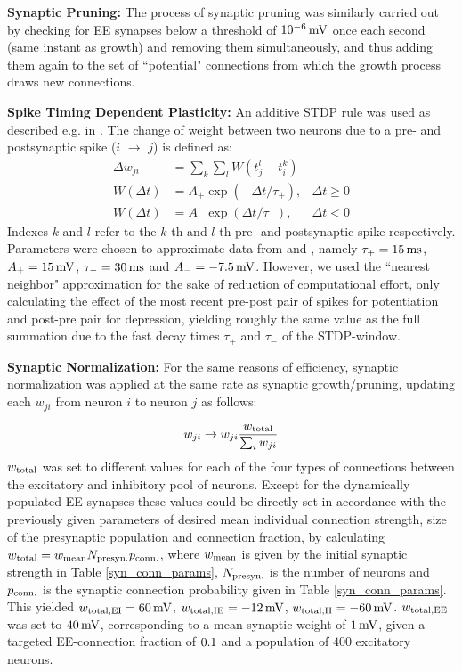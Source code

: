 \documentclass[10pt,letterpaper]{article}
\begin{document}
\textbf{Synaptic Pruning:} The process of synaptic pruning was similarly carried out by checking for EE synapses below a threshold of $\rm 10^{-6}\, mV$ once each second (same instant as growth) and removing them simultaneously, and thus adding them again to the set of ``potential" connections from which the growth process draws new connections.

\textbf{Spike Timing Dependent Plasticity:} An additive STDP rule was used as described e.g. in \cite{Zhang_STDP}. The change of weight between two neurons due to a pre- and postsynaptic spike ($i$ $\rightarrow$ $j$) is defined as:
\begin{align}
\Delta w_{ji} &= \sum_k \sum_l W(t_j^l - t_i^k) \label{STDP_rule} \\
W(\Delta t) &= A_{+} \exp(-\Delta t / \tau_{+}), & \Delta t \geq 0 \label{STDP_pos} \\
W(\Delta t) &= A_{-} \exp(\Delta t / \tau_{-}), & \Delta t < 0 \label{STDP_neg}
\end{align}
Indexes $k$ and $l$ refer to the $k$-th and $l$-th pre- and postsynaptic spike respectively. Parameters were chosen to approximate data from \cite{Bi_Poo_STDP} and \cite{Froemke_STDP}, namely $\tau_{+} = \rm 15\, ms$, $A_{+} =\rm 15\, mV$, $\tau_{-} =\rm 30\, ms$ and $A_{-} =\rm -7.5\, mV$. However, we used the ``nearest neighbor" approximation for the sake of reduction of computational effort, only calculating the effect of the most recent pre-post pair of spikes for potentiation and post-pre pair for depression, yielding roughly the same value as the full summation due to the fast decay times $\tau_{+}$ and $\tau_{-}$ of the STDP-window.

\textbf{Synaptic Normalization:} For the same reasons of efficiency, synaptic normalization was applied at the same rate as synaptic growth/pruning, updating each $w_{ji}$ from neuron $i$ to neuron $j$ as follows:

\begin{equation}
w_{ji} \rightarrow w_{ji} \frac{w_{\rm total}}{\sum_i w_{ji}}
\label{Synnnorm}
\end{equation}
$w_{\rm total}$ was set to different values for each of the four types of connections between the excitatory and inhibitory pool of neurons. Except for the dynamically populated EE-synapses these values could be directly set in accordance with the previously given parameters of desired mean individual connection strength, size of the presynaptic population and connection fraction, by calculating $w_{\rm total} = w_{\rm mean} N_{\rm presyn.} p_{\rm conn.}$, where $w_{\rm mean}$ is given by the initial synaptic strength in Table \ref{syn_conn_params}, $N_{\rm presyn.}$ is the number of neurons and $p_{\rm conn.}$ is the synaptic connection probability given in Table \ref{syn_conn_params}. This yielded $w_{\rm total,EI} = \rm 60\, mV$, $w_{\rm total,IE} =\rm -12\, mV$, $w_{\rm total,II} = \rm -60\, mV$. $w_{\rm total,EE}$ was set to $\rm 40\, mV$,  corresponding to a mean synaptic weight of $\rm 1\, mV$, given a targeted EE-connection fraction of $\rm 0.1$ and a population of $400$ excitatory neurons.
\end{document}
